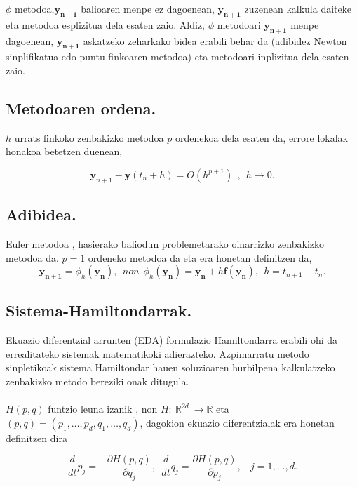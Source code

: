 $\phi$ metodoa,$\mathbf{y_{n+1}}$ balioaren menpe ez dagoenean, $\mathbf{y_{n+1}}$ zuzenean kalkula daiteke eta metodoa esplizitua dela esaten zaio. Aldiz, $\phi$ metodoari $\mathbf{y_{n+1}}$ menpe dagoenean, $\mathbf{y_{n+1}}$ askatzeko zeharkako bidea erabili behar da (adibidez Newton sinplifikatua edo puntu finkoaren metodoa) eta metodoari inplizitua dela esaten zaio.  
 
\subsection*{Metodoaren ordena.}
$h$ urrats finkoko zenbakizko metodoa $p$ ordenekoa dela esaten da, errore lokalak honakoa betetzen duenean,

\begin{equation} \label{eq:4}
\mathbf{y}_{n+1}-\mathbf{y}(t_{n}+h) = O(h^{p+1})\ \ , \ \ h \rightarrow 0.
\end{equation}


\subsection*{Adibidea.}
Euler metodoa , hasierako baliodun problemetarako oinarrizko zenbakizko metodoa da. $p=1$ ordeneko metodoa da eta era honetan definitzen da,
\begin{equation}
\label{eq41}
\mathbf{y_{n+1}}=\phi_h(\mathbf{y_n}), \ \ non \ \ \phi_h(\mathbf{y_n})=\mathbf{y_n}+h \mathbf{f}(\mathbf{y_n}) ,  \ \ h=t_{n+1}-t_{n}.
\end{equation} 


\subsection{Sistema-Hamiltondarrak.}

Ekuazio diferentzial arrunten (EDA) formulazio Hamiltondarra erabili ohi da errealitateko sistemak matematikoki adierazteko. Azpimarratu metodo sinpletikoak sistema Hamiltondar hauen soluzioaren hurbilpena kalkulatzeko zenbakizko metodo bereziki onak ditugula. 

\paragraph*{} $H(p,q)$ funtzio leuna izanik , non  $H: \ {\mathbb{R}}^{2d} \ \longrightarrow {\mathbb{R}}$ eta $(p,q)=(p_1, \dots , p_d,q_1, \dots , q_d)$,  dagokion ekuazio diferentzialak era honetan definitzen dira

\begin{equation}\label{eq:11}
\frac{d}{dt}{p}_j=-\frac{\partial H(p,q)}{\partial q_j}, \ \ \frac{d}{dt}{q}_j=\frac{\partial H(p,q)}{\partial p_j}, \ \ \ \ j=1,\dots,d.
\end{equation} 

